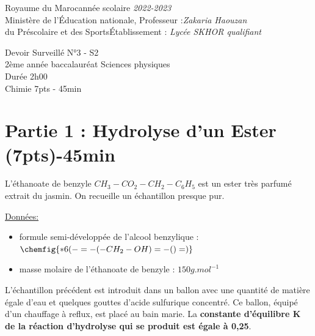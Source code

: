 \documentclass[12pt]{article}
\newcommand\headerMe[2]{\noindent{}#1\hfill#2}
\begin{document}
\headerMe{Royaume du Maroc}{année scolaire \emph{2022-2023}}\\
\headerMe{Ministère de l'Éducation nationale, }{  Professeur :\emph{Zakaria Haouzan}}\\
\headerMe{du Préscolaire et des Sports}{Établissement : \emph{Lycée SKHOR qualifiant}}\\
\begin{center}
Devoir Surveillé  N°3 - S2 \\
    2ème année baccalauréat Sciences physiques\\
Durée 2h00
\\
    \vspace{.2cm}
\hrulefill
\Large{Chimie 7pts - 45min}
\hrulefill\\

\end{center}

 \section*{Partie 1 : Hydrolyse d’un Ester \dotfill(7pts)-45min }
L’éthanoate de benzyle $CH_3-CO_2-CH_2-C_6H_5$ est un ester très parfumé extrait du jasmin. On recueille un échantillon presque pur.

\underline{Données:}
\begin{itemize}
	\item formule semi-développée de l’alcool benzylique : 
$\chemfig{*6(-=-(-CH_2-OH)=-()=)}$
\item masse molaire de l’éthanoate de benzyle : $150 g.mol^{-1}$
\end{itemize}
L’échantillon précédent est introduit dans un ballon avec une quantité de matière égale d’eau et quelques
gouttes d’acide sulfurique concentré. Ce ballon, équipé d’un chauffage à reflux, est placé au bain marie. La
\textbf{constante d’équilibre K de la réaction d’hydrolyse qui se produit est égale à 0,25}.
\end{document}
